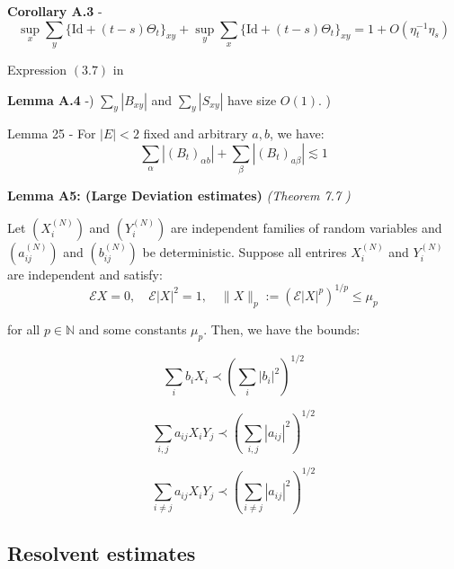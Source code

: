 \documentclass[11pt]{article}
\newenvironment{boxtheorem}[1]
  {\begin{mdframed}\noindent\textbf{#1}\itshape\space}
  {\end{mdframed}}
\newenvironment{boxt}[1]
  {\begin{mdframed}\noindent\textbf{#1}\normalfont\space}
  {\end{mdframed}}
\newcommand{\E}{\mathcal{E}}
\newcommand{\N}{\mathbb{N}}
\begin{document}
\begin{boxt}{Corollary A.3} \label{cor-a3} -
$$\sup_x \sum_y \{\text{Id}+(t-s)\Theta_t\}_{xy} + \sup_y \sum_x \{\text{Id} + (t-s)\Theta_t\}_{xy} = 1+O(\eta_t^{-1}\eta_s)$$


 Expression $(3.7)$ in \cite{bandSDE}
 \end{boxt}

\begin{boxt}{Lemma A.4} \label{lemma-a4} -) $\sum_y |B_{xy}|$ and $\sum_y |S_{xy}|$ have size $O(1)$. )

 Lemma 25 \cite{bandSDE} - For $|E|<2$ fixed and arbitrary $a, b$, we have: $$\sum_\alpha |(B_t)_{\alpha b}| + \sum_{\beta}|(B_t)_{a\beta}|\lesssim 1$$
 \end{boxt}
 
  

\begin{boxtheorem}{Lemma A5: (Large Deviation estimates)}   (Theorem 7.7 \cite{dynamic}) \label{lemma-a5}

  

Let $\left(X_i^{(N)}\right)$ and $\left(Y_i^{(N)}\right)$ are independent families of random variables and $\left(a_{ij}^{(N)}\right)$ and $\left(b_{ij}^{(N)}\right)$ be deterministic. Suppose all entrires $X_{i}^{(N)}$ and $Y_{i}^{(N)}$ are independent and satisfy: $$\E X = 0, \quad \E |X|^2=1, \quad \|X\|_p:=(\E |X|^p)^{1/p}\leq \mu_p$$

for all $p\in \N$ and some constants $\mu_p$. Then, we have the bounds: 

\begin{equation*}\sum_i b_i X_i \prec \left(\sum_i |b_i|^2\right)^{1/2}\tag{1.1}\end{equation*}

\begin{equation*}\sum_{i, j} a_{ij}X_iY_j \prec \left(\sum_{i,j} |a_{ij}|^2\right)^{1/2}\tag{1.2}\end{equation*}

\begin{equation*}\sum_{i\neq j} a_{ij}X_iY_j \prec \left(\sum_{i\neq j} |a_{ij}|^2\right)^{1/2}\tag{1.3}\end{equation*}

\end{boxtheorem}

\subsection{Resolvent estimates}
\end{document}
